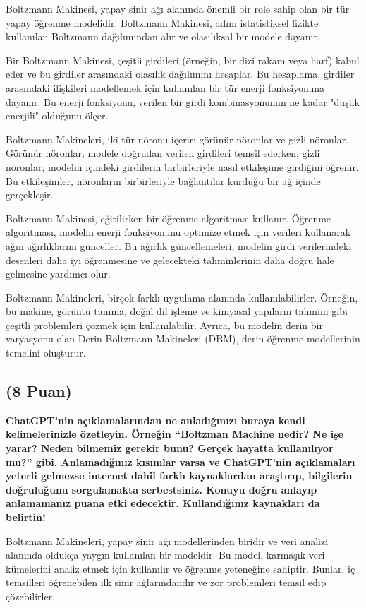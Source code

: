 \documentclass[11pt]{article}
\begin{document}
Boltzmann Makinesi, yapay sinir ağı alanında önemli bir role sahip olan bir tür yapay öğrenme modelidir. Boltzmann Makinesi, adını istatistiksel fizikte kullanılan Boltzmann dağılımından alır ve olasılıksal bir modele dayanır.

Bir Boltzmann Makinesi, çeşitli girdileri (örneğin, bir dizi rakam veya harf) kabul eder ve bu girdiler arasındaki olasılık dağılımını hesaplar. Bu hesaplama, girdiler arasındaki ilişkileri modellemek için kullanılan bir tür enerji fonksiyonuna dayanır. Bu enerji fonksiyonu, verilen bir girdi kombinasyonunun ne kadar "düşük enerjili" olduğunu ölçer.

Boltzmann Makineleri, iki tür nöronu içerir: görünür nöronlar ve gizli nöronlar. Görünür nöronlar, modele doğrudan verilen girdileri temsil ederken, gizli nöronlar, modelin içindeki girdilerin birbirleriyle nasıl etkileşime girdiğini öğrenir. Bu etkileşimler, nöronların birbirleriyle bağlantılar kurduğu bir ağ içinde gerçekleşir.

Boltzmann Makinesi, eğitilirken bir öğrenme algoritması kullanır. Öğrenme algoritması, modelin enerji fonksiyonunu optimize etmek için verileri kullanarak ağın ağırlıklarını günceller. Bu ağırlık güncellemeleri, modelin girdi verilerindeki desenleri daha iyi öğrenmesine ve gelecekteki tahminlerinin daha doğru hale gelmesine yardımcı olur.

Boltzmann Makineleri, birçok farklı uygulama alanında kullanılabilirler. Örneğin, bu makine, görüntü tanıma, doğal dil işleme ve kimyasal yapıların tahmini gibi çeşitli problemleri çözmek için kullanılabilir. Ayrıca, bu modelin derin bir varyasyonu olan Derin Boltzmann Makineleri (DBM), derin öğrenme modellerinin temelini oluşturur.

\subsection{(8 Puan)} \textbf{ChatGPT’nin açıklamalarından ne anladığınızı buraya kendi kelimelerinizle özetleyin. Örneğin ``Boltzman Machine nedir? Ne işe yarar? Neden bilmemiz gerekir bunu? Gerçek hayatta kullanılıyor mu?'' gibi. Anlamadığınız kısımlar varsa ve ChatGPT’nin açıklamaları yeterli gelmezse internet dahil farklı kaynaklardan araştırıp, bilgilerin doğruluğunu sorgulamakta serbestsiniz. Konuyu doğru anlayıp anlamamanız puana etki edecektir. Kullandığınız kaynakları da belirtin!}

Boltzmann Makineleri, yapay sinir ağı modellerinden biridir ve veri analizi alanında oldukça yaygın kullanılan bir modeldir. Bu model, karmaşık veri kümelerini analiz etmek için kullanılır ve öğrenme yeteneğine sahiptir.
Bunlar, iç temsilleri öğrenebilen ilk sinir ağlarındandır ve zor  problemleri temsil edip çözebilirler.
\end{document}
